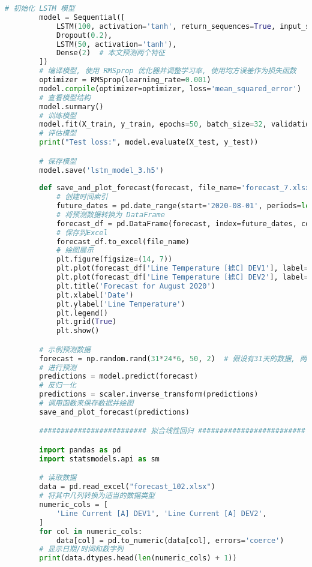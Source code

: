 \documentclass[withoutpreface,bwprint]{cumcmthesis}  %
\begin{document}
\begin{appendices}
\begin{lstlisting}[language=python]
        # 初始化 LSTM 模型
        model = Sequential([
            LSTM(100, activation='tanh', return_sequences=True, input_shape=(time_window, 2)),  
            Dropout(0.2),  
            LSTM(50, activation='tanh'), 
            Dense(2)  # 本文预测两个特征
        ])
        # 编译模型, 使用 RMSprop 优化器并调整学习率, 使用均方误差作为损失函数
        optimizer = RMSprop(learning_rate=0.001)
        model.compile(optimizer=optimizer, loss='mean_squared_error')
        # 查看模型结构
        model.summary()   
        # 训练模型
        model.fit(X_train, y_train, epochs=50, batch_size=32, validation_split=0.2, verbose=1)
        # 评估模型
        print("Test loss:", model.evaluate(X_test, y_test))

        # 保存模型
        model.save('lstm_model_3.h5')
    
        def save_and_plot_forecast(forecast, file_name='forecast_7.xlsx'):
            # 创建时间索引
            future_dates = pd.date_range(start='2020-08-01', periods=len(forecast), freq='10min')
            # 将预测数据转换为 DataFrame
            forecast_df = pd.DataFrame(forecast, index=future_dates, columns=['Line Temperature [掳C] DEV1', 'Line Temperature [掳C] DEV2'])
            # 保存到Excel
            forecast_df.to_excel(file_name)
            # 绘图展示
            plt.figure(figsize=(14, 7))
            plt.plot(forecast_df['Line Temperature [掳C] DEV1'], label='Forecast Line Temperature [掳C] DEV1')
            plt.plot(forecast_df['Line Temperature [掳C] DEV2'], label='Forecast Line Temperature [掳C] DEV2')
            plt.title('Forecast for August 2020')
            plt.xlabel('Date')
            plt.ylabel('Line Temperature')
            plt.legend()
            plt.grid(True)
            plt.show()

        # 示例预测数据
        forecast = np.random.rand(31*24*6, 50, 2)  # 假设有31天的数据, 两个电流列
        # 进行预测
        predictions = model.predict(forecast)
        # 反归一化
        predictions = scaler.inverse_transform(predictions)
        # 调用函数来保存数据并绘图
        save_and_plot_forecast(predictions)

        ######################### 拟合线性回归 #########################

        import pandas as pd
        import statsmodels.api as sm

        # 读取数据
        data = pd.read_excel("forecast_102.xlsx")
        # 将其中几列转换为适当的数据类型
        numeric_cols = [
            'Line Current [A] DEV1', 'Line Current [A] DEV2', 
        ]
        for col in numeric_cols:
            data[col] = pd.to_numeric(data[col], errors='coerce')
        # 显示日期/时间和数字列
        print(data.dtypes.head(len(numeric_cols) + 1))


\end{lstlisting}
\end{appendices}
\end{document}
